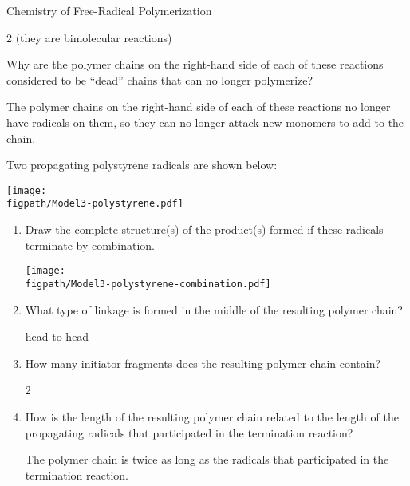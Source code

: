 \begin{activity}{Chemistry of Free-Radical Polymerization}
\begin{ctqs}
		\begin{solution}[0.5in]{}
			2 (they are bimolecular reactions)
		\end{solution}

	\question Why are the polymer chains on the right-hand side of each of these reactions considered to be ``dead'' chains that can no longer polymerize?
	
		\begin{solution}[1.25in]{}
			The polymer chains on the right-hand side of each of these reactions no longer have radicals on them, so they can no longer attack new monomers to add to the chain.
		\end{solution}
	
	\question Two propagating polystyrene radicals are shown below:
	
			\centerline{\texttt{[image: \\figpath/Model3-polystyrene.pdf]}}
	
		\begin{enumerate}
			\item Draw the complete structure(s) of the product(s) formed if these radicals terminate by combination.
	
				\begin{solution}[1.5in]{}
					\centerline{\texttt{[image: \\figpath/Model3-polystyrene-combination.pdf]}}
				\end{solution}
			
			\item What type of linkage is formed in the middle of the resulting polymer chain?
	
				\begin{solution}[0.25in]{}
					head-to-head
				\end{solution}
			
			\item How many initiator fragments does the resulting polymer chain contain?
	
				\begin{solution}[0.25in]{}
					2
				\end{solution}
			
			\item How is the length of the resulting polymer chain related to the length of the propagating radicals that participated in the termination reaction?
	
				\begin{solution}[0.5in]{}
					The polymer chain is twice as long as the radicals that participated in the termination reaction.
				\end{solution}
				

\end{enumerate}
\end{ctqs}
\end{activity}

